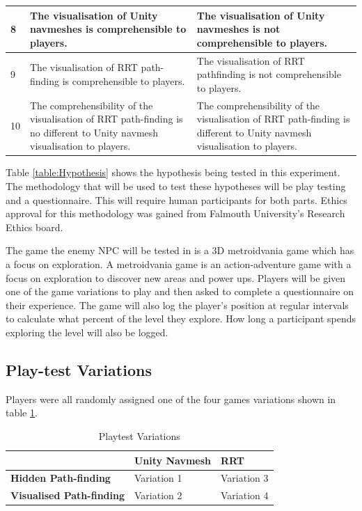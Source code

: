 \documentclass[journal]{IEEEtran}
\begin{document}
\begin{table}[h]
\begin{tabular}{|p{0.1cm}|p{3.75cm}|p{3.75cm}|}
		8 &   The visualisation of  Unity navmeshes is comprehensible to players.
		&  The visualisation of  Unity navmeshes is not comprehensible to players.
		\\ \hline
		
		9 &  The visualisation of  RRT path-finding is comprehensible to players.
		&  The visualisation of  RRT pathfinding is not comprehensible to players.
		\\ \hline
			
		10 &  The comprehensibility of  the visualisation of RRT path-finding is no different to Unity navmesh visualisation to players.
		&  The comprehensibility of  the visualisation of RRT path-finding is different to Unity navmesh visualisation to players.
		\\ \hline
	\end{tabular}
\end{table}
Table \ref{table:Hypothesis} shows the hypothesis being tested in this experiment. The methodology that will be used to test these hypotheses will be play testing and a questionnaire. This will require human participants for both parts. Ethics approval for this methodology was gained from Falmouth University’s Research Ethics board.

The game the enemy NPC will be tested in is a 3D metroidvania game which has a focus on exploration. A metroidvania game is an action-adventure game with a focus on exploration to discover new areas and power ups. Players will be given one of the game variations to play and then asked to complete a questionnaire on their experience. The game will also log the player's position at regular intervals to calculate what percent of the level they explore. How long a participant spends exploring the level will also be logged.

\subsection{Play-test Variations}
Players were all randomly assigned one of the four games variations shown in table \ref{table:PlaytestVariations}. 

\begin{table}[H]
	\centering
	\caption{Playtest Variations}
	\label{table:PlaytestVariations}
	\def\arraystretch{1.5}
	\begin{tabular}{ |l|l|l|}
		\hline
			  							& \textbf{Unity Navmesh}& \textbf{RRT} \\
		\hline
		\textbf{Hidden Path-finding}	& Variation 1			& Variation 3 \\
		\hline
		\textbf{Visualised Path-finding}& Variation 2		  	& Variation 4 \\
		\hline
	\end{tabular}
\end{table}
\end{document}
